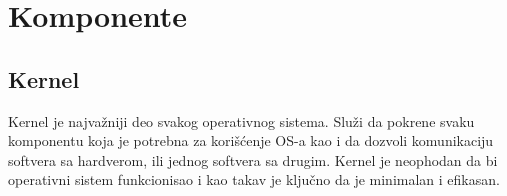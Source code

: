 \documentclass[a4paper,14pt]{article}
\begin{document}
\begin{figure}[h]
	\centering
\end{figure}
\newpage

\section{Komponente}
\subsection{Kernel}
Kernel je najvažniji deo svakog operativnog sistema. Služi da pokrene svaku komponentu koja je potrebna za korišćenje OS-a kao i da dozvoli komunikaciju softvera sa hardverom, ili jednog softvera sa drugim. Kernel je neophodan da bi operativni sistem funkcionisao i kao takav je ključno da je minimalan i efikasan.
\end{document}
